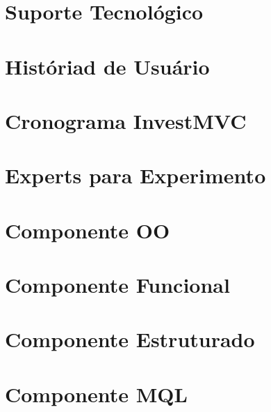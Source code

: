 \begin{apendicesenv}

\partapendices

\chapter{Suporte Tecnológico}


\chapter{Históriad de Usuário}


\chapter{Cronograma InvestMVC}


\chapter{Experts para Experimento}


\chapter{Componente OO}


\chapter{Componente Funcional}


\chapter{Componente Estruturado}


\chapter{Componente MQL}

\end{apendicesenv}